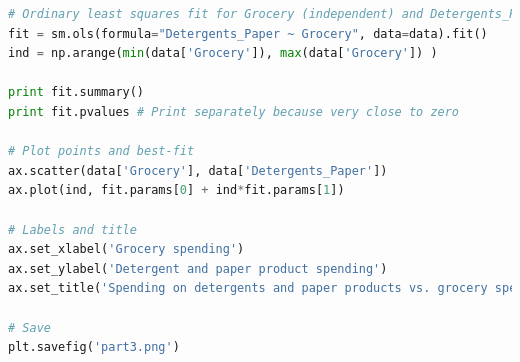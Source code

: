 \documentclass{article}
\begin{document}
\begin{lstlisting}[language=python]
# Ordinary least squares fit for Grocery (independent) and Detergents_Paper(dependent)
fit = sm.ols(formula="Detergents_Paper ~ Grocery", data=data).fit()
ind = np.arange(min(data['Grocery']), max(data['Grocery']) )

print fit.summary()
print fit.pvalues # Print separately because very close to zero

# Plot points and best-fit
ax.scatter(data['Grocery'], data['Detergents_Paper'])
ax.plot(ind, fit.params[0] + ind*fit.params[1])

# Labels and title
ax.set_xlabel('Grocery spending')
ax.set_ylabel('Detergent and paper product spending')
ax.set_title('Spending on detergents and paper products vs. grocery spending')

# Save
plt.savefig('part3.png')
	\end{lstlisting}
	
\end{document}
